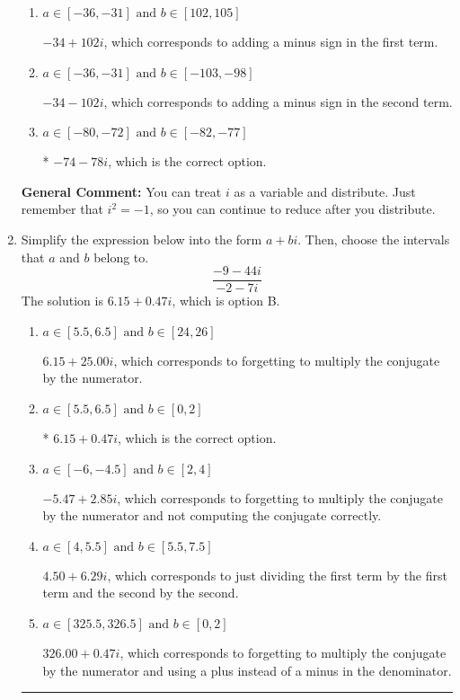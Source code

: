 \documentclass{extbook}[14pt]
\newcommand{\litem}[1]{\item #1

\rule{\textwidth}{0.4pt}}
\begin{document}
\begin{enumerate}
{\begin{enumerate}[label=\Alph*.]
 $-54 + 20 i$, which corresponds to just multiplying the real terms to get the real part of the solution and the coefficients in the complex terms to get the complex part.
\item \( a \in [-36, -31] \text{ and } b \in [102, 105] \)

 $-34 + 102 i$, which corresponds to adding a minus sign in the first term.
\item \( a \in [-36, -31] \text{ and } b \in [-103, -98] \)

 $-34 - 102 i$, which corresponds to adding a minus sign in the second term.
\item \( a \in [-80, -72] \text{ and } b \in [-82, -77] \)

* $-74 - 78 i$, which is the correct option.
\end{enumerate}

\textbf{General Comment:} You can treat $i$ as a variable and distribute. Just remember that $i^2=-1$, so you can continue to reduce after you distribute.
}
\litem{
Simplify the expression below into the form $a+bi$. Then, choose the intervals that $a$ and $b$ belong to.
\[ \frac{-9 - 44 i}{-2 - 7 i} \]
The solution is \( 6.15  + 0.47 i \), which is option B.\begin{enumerate}[label=\Alph*.]
\item \( a \in [5.5, 6.5] \text{ and } b \in [24, 26] \)

 $6.15  + 25.00 i$, which corresponds to forgetting to multiply the conjugate by the numerator.
\item \( a \in [5.5, 6.5] \text{ and } b \in [0, 2] \)

* $6.15  + 0.47 i$, which is the correct option.
\item \( a \in [-6, -4.5] \text{ and } b \in [2, 4] \)

 $-5.47  + 2.85 i$, which corresponds to forgetting to multiply the conjugate by the numerator and not computing the conjugate correctly.
\item \( a \in [4, 5.5] \text{ and } b \in [5.5, 7.5] \)

 $4.50  + 6.29 i$, which corresponds to just dividing the first term by the first term and the second by the second.
\item \( a \in [325.5, 326.5] \text{ and } b \in [0, 2] \)

 $326.00  + 0.47 i$, which corresponds to forgetting to multiply the conjugate by the numerator and using a plus instead of a minus in the denominator.
\end{enumerate}

}
\end{enumerate}
\end{document}
